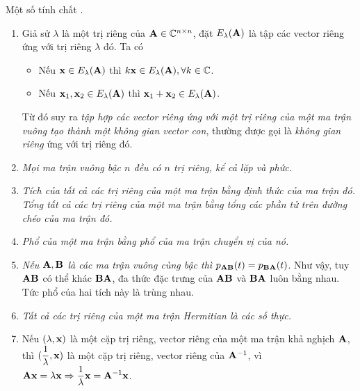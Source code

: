 Một số tính chất \cite{V1}.
\def\ElA{E_{\lambda}(\bA)}
\begin{enumerate}
	\item Giả sử $\lambda$ là một trị riêng của $\mathbf{A} \in \mathbb{C}^{n\times n}$, đặt $\ElA$ là tập các vector riêng ứng với trị riêng $\lambda$ đó. Ta có
	\begin{itemize}
		\item Nếu $\bx \in \ElA$ thì $k\bx \in \ElA, \forall k \in \mathbb{C}$.
		
		\item Nếu $\bx_1, \bx_2 \in \ElA$ thì $\bx_1 + \bx_2 \in \ElA$.
	\end{itemize}
	Từ đó suy ra \textit{tập hợp các vector riêng ứng với một trị riêng của một
		ma trận vuông tạo thành một không gian vector con}, thường được gọi là
	\textit{không gian riêng} ứng với trị riêng đó.
	
	\item \textit{Mọi ma trận vuông bậc $n$ đều có $n$ trị riêng, kể cả lặp và phức.}
	
	\item \textit{Tích của tất cả các trị riêng của một ma trận bằng định thức
		của ma trận đó. Tổng tất cả các trị riêng của một ma trận bằng tổng các
		phần tử trên đường chéo của ma trận đó.}
	
	
	\item \textit{Phổ của một ma trận bằng phổ của ma trận chuyển vị của nó.}
	
	
	\item \textit{Nếu $\mathbf{A}, \mathbf{B}$ là các ma trận vuông cùng bậc thì
		$p_{\mathbf{A}\mathbf{B}}(t) = p_ {\mathbf{B}\mathbf{A}}(t)$}. Như vậy, tuy $\mathbf{A}\mathbf{B}$ có thể khác
	$\mathbf{B}\mathbf{A}$, đa thức đặc trưng của $\mathbf{A}\mathbf{B}$ và $\mathbf{B}\mathbf{A}$ luôn bằng nhau. Tức phổ của hai tích này là trùng nhau.
	
	\item \textit{Tất cả các trị riêng của một ma trận Hermitian là các số
		thực.} 	
	\item Nếu $(\lambda, \mathbf{x})$ là một cặp trị riêng, vector riêng của một ma
	trận khả nghịch $\mathbf{A}$, thì $\displaystyle(\frac{1}{\lambda}, \mathbf{x})$ là một
	cặp trị riêng, vector riêng của $\mathbf{A}^{-1}$, vì $\displaystyle \mathbf{A}\mathbf{x} =
	\lambda\mathbf{x} \Rightarrow \frac{1} {\lambda}\mathbf{x} = \mathbf{A}^{-1}\mathbf{x}$.
	
	
\end{enumerate}
